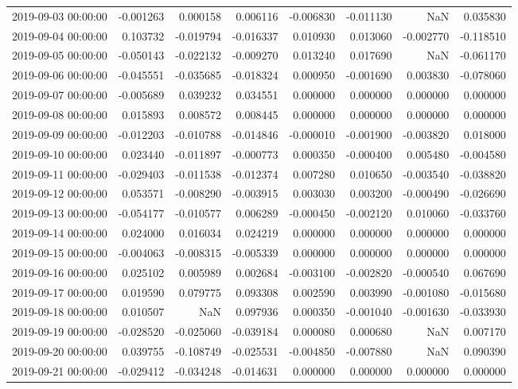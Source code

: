 \begin{tabular}{lrrrrrrr}
2019-09-03 00:00:00 & -0.001263 & 0.000158 & 0.006116 & -0.006830 & -0.011130 & NaN & 0.035830 \\
2019-09-04 00:00:00 & 0.103732 & -0.019794 & -0.016337 & 0.010930 & 0.013060 & -0.002770 & -0.118510 \\
2019-09-05 00:00:00 & -0.050143 & -0.022132 & -0.009270 & 0.013240 & 0.017690 & NaN & -0.061170 \\
2019-09-06 00:00:00 & -0.045551 & -0.035685 & -0.018324 & 0.000950 & -0.001690 & 0.003830 & -0.078060 \\
2019-09-07 00:00:00 & -0.005689 & 0.039232 & 0.034551 & 0.000000 & 0.000000 & 0.000000 & 0.000000 \\
2019-09-08 00:00:00 & 0.015893 & 0.008572 & 0.008445 & 0.000000 & 0.000000 & 0.000000 & 0.000000 \\
2019-09-09 00:00:00 & -0.012203 & -0.010788 & -0.014846 & -0.000010 & -0.001900 & -0.003820 & 0.018000 \\
2019-09-10 00:00:00 & 0.023440 & -0.011897 & -0.000773 & 0.000350 & -0.000400 & 0.005480 & -0.004580 \\
2019-09-11 00:00:00 & -0.029403 & -0.011538 & -0.012374 & 0.007280 & 0.010650 & -0.003540 & -0.038820 \\
2019-09-12 00:00:00 & 0.053571 & -0.008290 & -0.003915 & 0.003030 & 0.003200 & -0.000490 & -0.026690 \\
2019-09-13 00:00:00 & -0.054177 & -0.010577 & 0.006289 & -0.000450 & -0.002120 & 0.010060 & -0.033760 \\
2019-09-14 00:00:00 & 0.024000 & 0.016034 & 0.024219 & 0.000000 & 0.000000 & 0.000000 & 0.000000 \\
2019-09-15 00:00:00 & -0.004063 & -0.008315 & -0.005339 & 0.000000 & 0.000000 & 0.000000 & 0.000000 \\
2019-09-16 00:00:00 & 0.025102 & 0.005989 & 0.002684 & -0.003100 & -0.002820 & -0.000540 & 0.067690 \\
2019-09-17 00:00:00 & 0.019590 & 0.079775 & 0.093308 & 0.002590 & 0.003990 & -0.001080 & -0.015680 \\
2019-09-18 00:00:00 & 0.010507 & NaN & 0.097936 & 0.000350 & -0.001040 & -0.001630 & -0.033930 \\
2019-09-19 00:00:00 & -0.028520 & -0.025060 & -0.039184 & 0.000080 & 0.000680 & NaN & 0.007170 \\
2019-09-20 00:00:00 & 0.039755 & -0.108749 & -0.025531 & -0.004850 & -0.007880 & NaN & 0.090390 \\
2019-09-21 00:00:00 & -0.029412 & -0.034248 & -0.014631 & 0.000000 & 0.000000 & 0.000000 & 0.000000 \\

\end{tabular}
